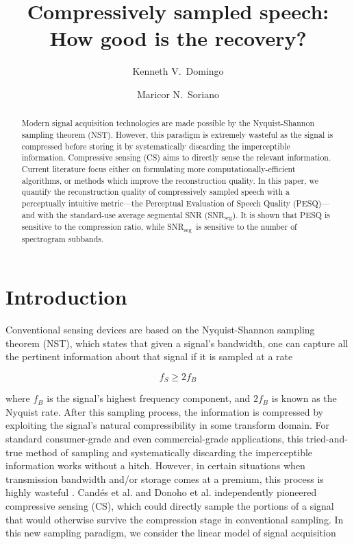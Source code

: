 \documentclass[10pt,a4paper,twoside]{article}
\newcommand{\snrseg}{SNR$_{\mathrm{seg}}$}
\begin{document}
\title{\TitleFont Compressively sampled speech: How good is the recovery?}

\author[*\negthickspace]{Kenneth V.~Domingo}
\author[ ]{Maricor N.~Soriano
\lastauthorsep}


\begin{abstract}
\noindent
Modern signal acquisition technologies are made possible by the Nyquist-Shannon sampling theorem (NST). However, this paradigm is extremely wasteful as the signal is compressed before storing it by systematically discarding the imperceptible information. Compressive sensing (CS) aims to directly sense the relevant information. Current literature focus either on formulating more computationally-efficient algorithms, or methods which improve the reconstruction quality. In this paper, we quantify the reconstruction quality of compressively sampled speech with a perceptually intuitive metric---the Perceptual Evaluation of Speech Quality (PESQ)---and with the standard-use average segmental SNR (\snrseg). It is shown that PESQ is sensitive to the compression ratio, while \snrseg~is sensitive to the number of spectrogram subbands.


\end{abstract}

\maketitle
\thispagestyle{titlestyle}

\section{Introduction}\label{sec:intro}
Conventional sensing devices are based on the Nyquist-Shannon sampling theorem (NST), which states that given a signal's bandwidth, one can capture all the pertinent information about that signal if it is sampled at a rate

\begin{equation} \label{eq:nst}
	f_S \geq 2f_B
\end{equation}

\noindent where $f_B$ is the signal's highest frequency component, and $2f_B$ is known as the Nyquist rate. After this sampling process, the information is compressed by exploiting the signal's natural compressibility in some transform domain. For standard consumer-grade and even commercial-grade applications, this tried-and-true method of sampling and systematically discarding the imperceptible information works without a hitch. However, in certain situations when transmission bandwidth and/or storage comes at a premium, this process is highly wasteful \cite{Candes2008b}. Cand\'{e}s et al. \cite{Candes2006} and Donoho et al. \cite{Donoho2006} independently pioneered compressive sensing (CS), which could directly sample the portions of a signal that would otherwise survive the compression stage in conventional sampling. In this new sampling paradigm, we consider the linear model of signal acquisition
\end{document}
